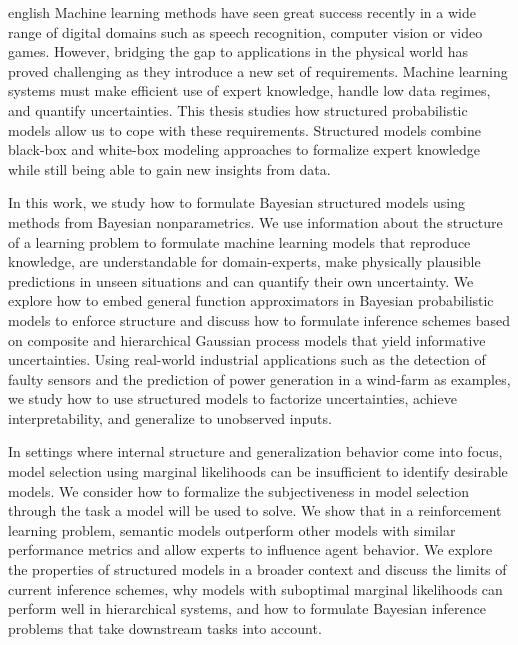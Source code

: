 \begin{Abstract}{english}
    Machine learning methods have seen great success recently in a wide range of digital domains such as speech recognition, computer vision or video games.
    However, bridging the gap to applications in the physical world has proved challenging as they introduce a new set of requirements.
    Machine learning systems must make efficient use of expert knowledge, handle low data regimes, and quantify uncertainties.
    This thesis studies how structured probabilistic models allow us to cope with these requirements.
    Structured models combine black-box and white-box modeling approaches to formalize expert knowledge while still being able to gain new insights from data.

    In this work, we study how to formulate Bayesian structured models using methods from Bayesian nonparametrics.
    We use information about the structure of a learning problem to formulate machine learning models that reproduce knowledge, are understandable for domain-experts, make physically plausible predictions in unseen situations and can quantify their own uncertainty.
    We explore how to embed general function approximators in Bayesian probabilistic models to enforce structure and discuss how to formulate inference schemes based on composite and hierarchical Gaussian process models that yield informative uncertainties.
    Using real-world industrial applications such as the detection of faulty sensors and the prediction of power generation in a wind-farm as examples, we study how to use structured models to factorize uncertainties, achieve interpretability, and generalize to unobserved inputs.

    In settings where internal structure and generalization behavior come into focus, model selection using marginal likelihoods can be insufficient to identify desirable models.
    We consider how to formalize the subjectiveness in model selection through the task a model will be used to solve.
    We show that in a reinforcement learning problem, semantic models outperform other models with similar performance metrics and allow experts to influence agent behavior.
    We explore the properties of structured models in a broader context and discuss the limits of current inference schemes, why models with suboptimal marginal likelihoods can perform well in hierarchical systems, and how to formulate Bayesian inference problems that take downstream tasks into account.
\end{Abstract}

